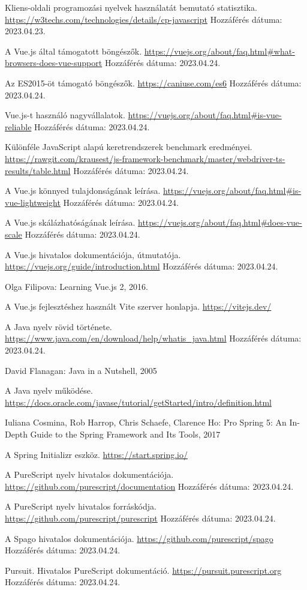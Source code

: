 \documentclass[12pt]{article}
\begin{document}
\begin{thebibliography}{99}
Kliens-oldali programozási nyelvek használatát bemutató statisztika. \url{https://w3techs.com/technologies/details/cp-javascript}  Hozzáférés dátuma: 2023.04.23.

A Vue.js által támogatott böngészők. \url{https://vuejs.org/about/faq.html#what-browsers-does-vue-support} Hozzáférés dátuma: 2023.04.24.

Az ES2015-öt támogató böngészők. \url{https://caniuse.com/es6} Hozzáférés dátuma: 2023.04.24.

Vue.js-t használó nagyvállalatok. \url{https://vuejs.org/about/faq.html#is-vue-reliable} Hozzáférés dátuma: 2023.04.24.

Különféle JavaScript alapú keretrendszerek benchmark eredményei. \url{https://rawgit.com/krausest/js-framework-benchmark/master/webdriver-ts-results/table.html} Hozzáférés dátuma: 2023.04.24.

A Vue.js könnyed tulajdonságának leírása. \url{https://vuejs.org/about/faq.html#is-vue-lightweight} Hozzáférés dátuma: 2023.04.24.

A Vue.js skálázhatóságának leírása. \url{https://vuejs.org/about/faq.html#does-vue-scale} Hozzáférés dátuma: 2023.04.24.

A Vue.js hivatalos dokumentációja, útmutatója. \url{https://vuejs.org/guide/introduction.html} Hozzáférés dátuma: 2023.04.24.

Olga Filipova: Learning Vue.js 2, 2016.

A Vue.js fejlesztéshez használt Vite szerver honlapja. \url{https://vitejs.dev/}

A Java nyelv rövid története. \url{https://www.java.com/en/download/help/whatis_java.html} Hozzáférés dátuma: 2023.04.24.

David Flanagan: Java in a Nutshell, 2005

A Java nyelv működése. \url{https://docs.oracle.com/javase/tutorial/getStarted/intro/definition.html}

Iuliana Cosmina, Rob Harrop, Chris Schaefe, Clarence Ho: Pro Spring 5: An In-Depth Guide to the Spring Framework and Its Tools, 2017

A Spring Initializr eszköz. \url{https://start.spring.io/}

A PureScript nyelv hivatalos dokumentációja.
\url{https://github.com/purescript/documentation} Hozzáférés dátuma: 2023.04.24.

A PureScript nyelv hivatalos forráskódja.
\url{https://github.com/purescript/purescript} Hozzáférés dátuma: 2023.04.24.

A Spago hivatalos dokumentációja.
\url{https://github.com/purescript/spago} Hozzáférés dátuma: 2023.04.24.

Pursuit. Hivatalos PureScript dokumentáció.
\url{https://pursuit.purescript.org} Hozzáférés dátuma: 2023.04.24.

\end{thebibliography}
\end{document}
